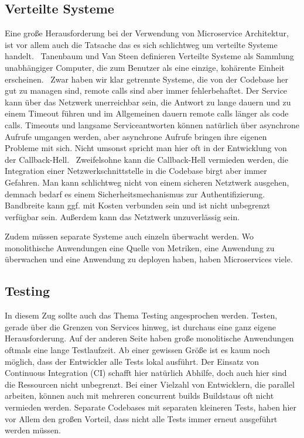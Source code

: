 \subsection{Verteilte Systeme}
Eine große Herausforderung bei der Verwendung von Microservice Architektur, ist vor allem auch die Tatsache das es sich schlichtweg um verteilte Systeme handelt.~\cite[][]{microtradeoffs}
Tanenbaum und Van Steen definieren Verteilte Systeme als Sammlung unabhängiger Computer, die zum Benutzer als eine einzige, kohärente Einheit erscheinen.~\cite[][Seite 2]{tanenbaum2002distributed}
Zwar haben wir klar getrennte Systeme, die von der Codebase her gut zu managen sind, remote calls sind aber immer fehlerbehaftet. Der Service kann über das Netzwerk unerreichbar sein, die Antwort zu lange dauern und zu einem Timeout führen und im Allgemeinen dauern remote calls länger als code calls. Timeouts und langsame Serviceantworten können natürlich über asynchrone Aufrufe umgangen werden, aber asynchrone Aufrufe bringen ihre eigenen Probleme mit sich. Nicht umsonst spricht man hier oft in der Entwicklung von der Callback-Hell.~\cite[vgl.][]{callbackhell} Zweifelsohne kann die Callback-Hell vermieden werden, die Integration einer Netzwerkschnittstelle in die Codebase birgt aber immer Gefahren. Man kann schlichtweg nicht von einem sicheren Netztwerk ausgehen, demnach bedarf es einem Sicherheitsmechanismus zur Authentifizierung. Bandbreite kann ggf. mit Kosten verbunden sein und ist nicht unbegrenzt verfügbar sein. Außerdem kann das Netztwerk unzuverlässig sein.~\cite[vgl.][]{distributedfallacies}

Zudem müssen separate Systeme auch einzeln überwacht werden. Wo monolithische Anwendungen eine Quelle von Metriken, eine Anwendung zu überwachen und eine Anwendung zu deployen haben, haben Microservices viele.~\cite[vgl.][]{Heroku:GoMicro}

\subsection{Testing}
\label{section:testing}
In diesem Zug sollte auch das Thema Testing angesprochen werden. Testen, gerade über die Grenzen von Services hinweg, ist durchaus eine ganz eigene Herausforderung. Auf der anderen Seite haben große monolitische Anwendungen oftmals eine lange Testlaufzeit. Ab einer gewissen Größe ist es kaum noch möglich, dass der Entwickler alle Tests lokal ausführt. Der Einsatz von Continuous Integration (CI) schafft hier natürlich Abhilfe, doch auch hier sind die Ressourcen nicht unbegrenzt. Bei einer Vielzahl von Entwicklern, die parallel arbeiten, können auch mit mehreren concurrent builds Buildstaus oft nicht vermieden werden. Separate Codebases mit separaten kleineren Tests, haben hier vor Allem den großen Vorteil, dass nicht alle Tests immer erneut ausgeführt werden müssen.

